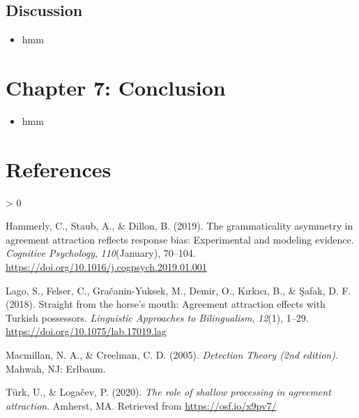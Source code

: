 \documentclass[
  10pt,
  english,
  doc,floatsintext]{apa6}
\providecommand{\tightlist}{%
  \setlength{\itemsep}{0pt}\setlength{\parskip}{0pt}}
\newlength{\cslhangindent}
\newenvironment{CSLReferences}[2] %
 {%
  \setlength{\parindent}{0pt}
  \ifodd #1 \everypar{\setlength{\hangindent}{\cslhangindent}}\ignorespaces\fi
  \ifnum #2 > 0
  \setlength{\parskip}{#2\baselineskip}
  \fi
 }%
 {}
\begin{document}
\hypertarget{discussion-1}{%
\subsection{Discussion}\label{discussion-1}}

\begin{itemize}
\tightlist
\item
  hmm
\end{itemize}

\hypertarget{chapter-7-conclusion}{%
\section{Chapter 7: Conclusion}\label{chapter-7-conclusion}}

\begin{itemize}
\tightlist
\item
  hmm
\end{itemize}

\newpage

\hypertarget{references}{%
\section{References}\label{references}}

\begingroup
\setlength{\parindent}{-0.5in}
\setlength{\leftskip}{0.5in}

\hypertarget{refs}{}
\begin{CSLReferences}{1}{0}
\leavevmode\hypertarget{ref-HammerlyEtAl2019}{}%
Hammerly, C., Staub, A., \& Dillon, B. (2019). The grammaticality asymmetry in agreement attraction reflects response bias: Experimental and modeling evidence. \emph{Cognitive Psychology}, \emph{110}(January), 70--104. \url{https://doi.org/10.1016/j.cogpsych.2019.01.001}

\leavevmode\hypertarget{ref-LagoEtAl2018}{}%
Lago, S., Felser, C., Gračanin-Yuksek, M., Demir, O., Kırkıcı, B., \& Şafak, D. F. (2018). Straight from the horse's mouth: Agreement attraction effects with Turkish possessors. \emph{Linguistic Approaches to Bilingualism}, \emph{12}(1), 1--29. \url{https://doi.org/10.1075/lab.17019.lag}

\leavevmode\hypertarget{ref-MacmillanCreelman2005}{}%
Macmillan, N. A., \& Creelman, C. D. (2005). \emph{Detection Theory (2nd edition)}. Mahwah, NJ: Erlbaum.

\leavevmode\hypertarget{ref-TurkLogacev2020}{}%
Türk, U., \& Logačev, P. (2020). \emph{The role of shallow processing in agreement attraction}. Amherst, MA. Retrieved from \url{https://osf.io/x9pv7/}

\end{CSLReferences}

\endgroup
\end{document}
